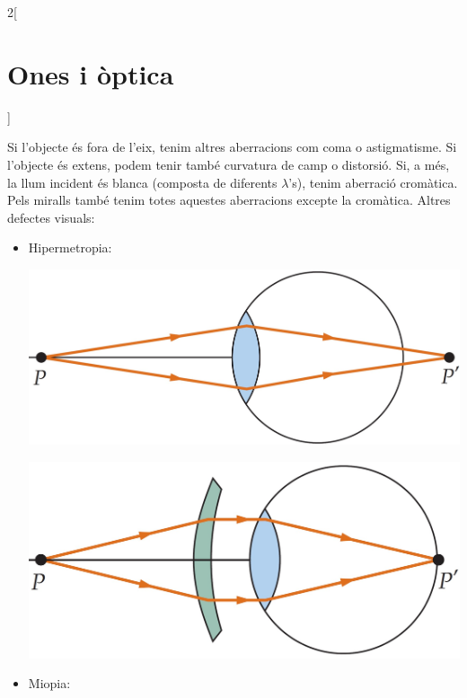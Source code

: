 \documentclass[../../../main.tex]{subfiles}
\begin{document}
\begin{multicols}{2}[\section{Ones i òptica}]
\begin{itemize}
  \end{itemize}
  Si l'objecte és fora de l'eix, tenim altres aberracions com coma o astigmatisme.\newline
  Si l'objecte és extens, podem tenir també curvatura de camp o distorsió.\newline
  Si, a més, la llum incident és blanca (composta de diferents $\lambda$'s), tenim aberració cromàtica.\newline
  Pels miralls també tenim totes aquestes aberracions excepte la cro\-mà\-ti\-ca.\newline
  Altres defectes visuals:
  \begin{itemize}
    \item Hipermetropia:\newline
          \begin{minipage}{\linewidth}
            \includegraphics[width=\linewidth]{Physics/1st/Waves_and_optics/Images/hip.jpg}
          \end{minipage}\hspace{0.15cm}
          \begin{minipage}{\linewidth}
            \includegraphics[width=\linewidth]{Physics/1st/Waves_and_optics/Images/hip1.jpg}
          \end{minipage}
    \item Miopia:\newline

\end{itemize}
\end{multicols}
\end{document}
